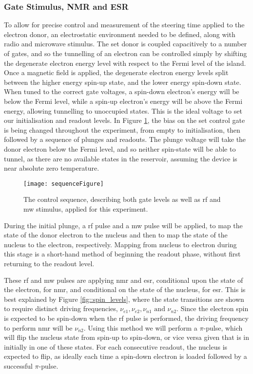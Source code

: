 	\subsubsection{Gate Stimulus, NMR and ESR}
		To allow for precise control and measurement of the steering time applied to the electron donor, an electrostatic environment needed to be defined, along with radio and microwave stimulus. The \gls{set} donor is coupled capacitively to a number of gates, and so the tunnelling of an electron can be controlled simply by shifting the degenerate electron energy level with respect to the Fermi level of the island. Once a magnetic field is applied, the degenerate electron energy levels split between the higher energy spin-up state, and the lower energy spin-down state. When tuned to the correct gate voltages, a spin-down electron's energy will be below the Fermi level, while a spin-up electron's energy will be above the Fermi energy, allowing tunnelling to unoccupied states. This is the ideal voltage to set our initialisation and readout levels. In Figure \ref{fig::sequence}, the bias on the \gls{set} control gate is being changed throughout the experiment, from empty to initialisation, then followed by a sequence of plunges and readouts. The plunge voltage will take the donor electron below the Fermi level, and so neither spin-state will be able to tunnel, as there are no available states in the reservoir, assuming the device is near absolute zero temperature.
		
		
		\begin{figure}[htbp!]
			\centering
			\texttt{[image: sequenceFigure]}
			\caption{The control sequence, describing both gate levels as well as \gls{rf} and \gls{mw} stimulus, applied for this experiment.}
			\label{fig::sequence}
		\end{figure}
		
		During the initial plunge, a \gls{rf} pulse and a \gls{mw} pulse will be applied, to map the state of the donor electron to the nucleus and then to map the state of the nucleus to the electron, respectively. Mapping from nucleus to electron during this stage is a short-hand method of beginning the readout phase, without first returning to the readout level.
		
		These \gls{rf} and \gls{mw} pulses are applying \gls{nmr} and \gls{esr}, conditional upon the state of the electron, for \gls{nmr}, and conditional on the state of the nucleus, for \gls{esr}. This is best explained by Figure \ref{fig::spin_levels}, where the state transitions are shown to require distinct driving frequencies, $\nu_{e1}, \nu_{e2}, \nu_{n1} \textrm{ and } \nu_{n2}$. Since the electron spin is expected to be spin-down when the \gls{rf} pulse is performed, the driving frequency to perform \gls{nmr} will be $\nu_{n2}$. Using this method we will perform a $\pi$-pulse, which will flip the nucleus state from spin-up to spin-down, or vice versa given that is in initially in one of these states. For each consecutive readout, the nucleus is expected to flip, as ideally each time a spin-down electron is loaded followed by a successful $\pi$-pulse.
		
